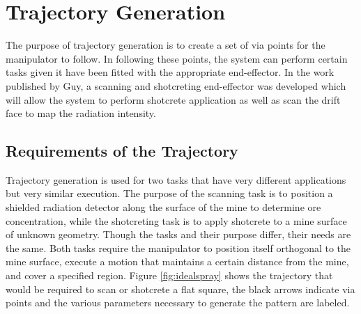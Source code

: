 \chapter{Trajectory Generation}
\label{chap:traj}
The purpose of trajectory generation is to create a set of via points for the manipulator to follow. In following these points, the system can perform certain tasks given it have been fitted with the appropriate end-effector. In the work published by Guy, a scanning and shotcreting end-effector was developed which will allow the system to perform shotcrete application as well as scan the drift face to map the radiation intensity.\\
\section{Requirements of the Trajectory}
\label{sec:four}
Trajectory generation is used for two tasks that have very different applications but very similar execution. The purpose of the scanning task is to position a shielded radiation detector along the surface of the mine to determine ore concentration, while the shotcreting task is to apply shotcrete to a mine surface of unknown geometry. Though the tasks and their purpose differ, their needs are the same. Both tasks require the manipulator to position itself orthogonal to the mine surface, execute a motion that maintains a certain distance from the mine, and cover a specified region. Figure \ref{fig:idealspray} shows the trajectory that would be required to scan or shotcrete a flat square, the black arrows indicate via points and the various parameters necessary to generate the pattern are labeled.\\

